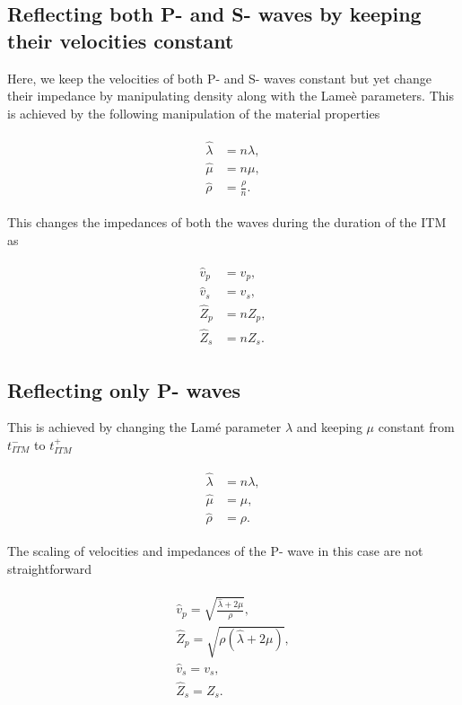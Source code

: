 \subsection{Reflecting both P- and S- waves by keeping their velocities constant}
Here, we keep the velocities of both P- and S- waves constant but yet change their impedance by manipulating density along with the Lame\`{e} parameters. This is achieved by the following manipulation of the material properties

\begin{align}
    \begin{split}
        \hat{\lambda} &= n \lambda ,\\
        \hat{\mu} &= n \mu ,\\
        \hat{\rho} &= \frac{\rho} {n} .
    \end{split}
\end{align}

This changes the impedances of both the waves during the duration of the \ac{ITM} as

\begin{align}
    \begin{split}
        \hat{v}_p &= v_p ,\\
        \hat{v}_s &= v_s ,\\
        \hat{Z}_p &= n Z_p ,\\
        \hat{Z}_s &= n Z_s .
    \end{split}
\end{align}

\subsection{Reflecting only P- waves}

This is achieved by changing the Lam\'{e} parameter $\lambda$ and keeping $\mu$ constant from $t_{ITM}^-$ to $t_{ITM}^+$

\begin{align}
    \begin{split}
        \hat{\lambda} &= n \lambda ,\\
        \hat{\mu} &= \mu ,\\
        \hat{\rho} &= \rho .
    \end{split}
\end{align}

The scaling of velocities and impedances of the P- wave in this case are not straightforward 

\begin{align}
    \begin{split}
        \hat{v}_p = \sqrt{\frac{\hat{\lambda} + 2 \mu}{\rho}} ,\\
        \hat{Z}_p = \sqrt{\rho\left(\hat{\lambda} + 2 \mu \right)} ,\\
        \hat{v}_s = v_s ,\\
        \hat{Z}_s = Z_s . 
    \end{split}
\end{align}

